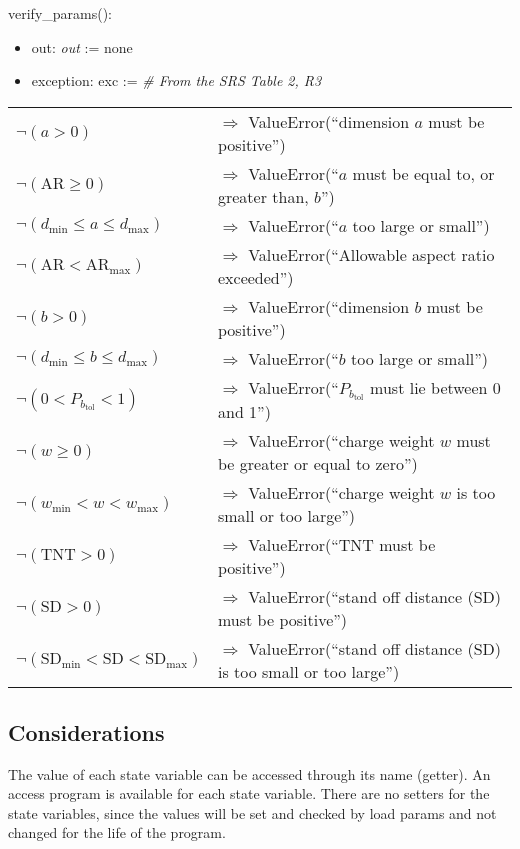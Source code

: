\documentclass[12pt, titlepage]{article}
\begin{document}
\noindent verify\_params():
\begin{itemize}
\item out: \textit{out} := none
\item exception: exc := \textit{\# From the SRS Table 2, R3}
\end{itemize}
\noindent \begin{longtable*}[l]{l l}
  $\neg (a > 0)$ & $\Rightarrow$ ValueError(``dimension $a$ must be positive'')\\
  $\neg (\text{AR} \geq 0)$ & $\Rightarrow$ ValueError(``$a$ must be equal to, or
  greater than, $b$'')\\
  $\neg (d_{\text{min}} \leq a \leq d_{\text{max}})$ & $\Rightarrow$
  ValueError(``$a$ too
  large or small'')\\
  $\neg(\text{AR}< \text{AR}_{\text{max}})$ & $\Rightarrow$ ValueError(``Allowable
  aspect
  ratio exceeded'')\\
  $\neg (b > 0)$ & $\Rightarrow$ ValueError(``dimension $b$ must be positive'')\\
  $\neg(d_{\text{min}} \leq b \leq d_{\text{max}})$ & $\Rightarrow$
  ValueError(``$b$ too
  large or small'')\\
  $\neg(0 < P_{b_{\text{tol}}} < 1)$ & $\Rightarrow$
  ValueError(``$P_{b_{\text{tol}}}$
  must lie between 0 and 1'')\\
  $\neg (w \geq 0)$ & $\Rightarrow$ ValueError(``charge weight $w$ must be
  greater
  or equal to zero'')\\
  $\neg (w_{\text{min}}<w<w_{\text{max}})$ & $\Rightarrow$ ValueError(``charge
  weight $w$ is too small or too large'')\\
  $\neg (\mbox{TNT} > 0)$ & $\Rightarrow$ ValueError(``TNT must be positive'')\\
  $\neg (\mbox{SD} > 0)$ & $\Rightarrow$ ValueError(``stand off distance (SD)
  must be positive'')\\
  $\neg (\text{SD}_{\text{min}}<\text{SD}<\text{SD}_{\text{max}})$ &
  $\Rightarrow$ ValueError(``stand off distance (SD) is too small or too large'')\\

\end{longtable*}

\subsection{Considerations}

The value of each state variable can be accessed through its name (getter).  An
access program is available for each state variable.  There are no setters for
the state variables, since the values will be set and checked by load params and
not changed for the life of the program.
\end{document}
